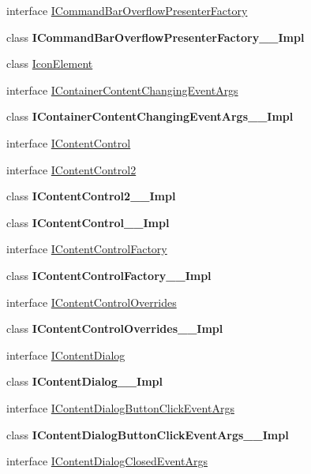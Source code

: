 \begin{DoxyCompactItemize}
\item 
interface \hyperlink{interface_windows_1_1_u_i_1_1_xaml_1_1_controls_1_1_i_command_bar_overflow_presenter_factory}{I\+Command\+Bar\+Overflow\+Presenter\+Factory}
\item 
class {\bfseries I\+Command\+Bar\+Overflow\+Presenter\+Factory\+\_\+\+\_\+\+Impl}
\item 
class \hyperlink{class_windows_1_1_u_i_1_1_xaml_1_1_controls_1_1_icon_element}{Icon\+Element}
\item 
interface \hyperlink{interface_windows_1_1_u_i_1_1_xaml_1_1_controls_1_1_i_container_content_changing_event_args}{I\+Container\+Content\+Changing\+Event\+Args}
\item 
class {\bfseries I\+Container\+Content\+Changing\+Event\+Args\+\_\+\+\_\+\+Impl}
\item 
interface \hyperlink{interface_windows_1_1_u_i_1_1_xaml_1_1_controls_1_1_i_content_control}{I\+Content\+Control}
\item 
interface \hyperlink{interface_windows_1_1_u_i_1_1_xaml_1_1_controls_1_1_i_content_control2}{I\+Content\+Control2}
\item 
class {\bfseries I\+Content\+Control2\+\_\+\+\_\+\+Impl}
\item 
class {\bfseries I\+Content\+Control\+\_\+\+\_\+\+Impl}
\item 
interface \hyperlink{interface_windows_1_1_u_i_1_1_xaml_1_1_controls_1_1_i_content_control_factory}{I\+Content\+Control\+Factory}
\item 
class {\bfseries I\+Content\+Control\+Factory\+\_\+\+\_\+\+Impl}
\item 
interface \hyperlink{interface_windows_1_1_u_i_1_1_xaml_1_1_controls_1_1_i_content_control_overrides}{I\+Content\+Control\+Overrides}
\item 
class {\bfseries I\+Content\+Control\+Overrides\+\_\+\+\_\+\+Impl}
\item 
interface \hyperlink{interface_windows_1_1_u_i_1_1_xaml_1_1_controls_1_1_i_content_dialog}{I\+Content\+Dialog}
\item 
class {\bfseries I\+Content\+Dialog\+\_\+\+\_\+\+Impl}
\item 
interface \hyperlink{interface_windows_1_1_u_i_1_1_xaml_1_1_controls_1_1_i_content_dialog_button_click_event_args}{I\+Content\+Dialog\+Button\+Click\+Event\+Args}
\item 
class {\bfseries I\+Content\+Dialog\+Button\+Click\+Event\+Args\+\_\+\+\_\+\+Impl}
\item 
interface \hyperlink{interface_windows_1_1_u_i_1_1_xaml_1_1_controls_1_1_i_content_dialog_closed_event_args}{I\+Content\+Dialog\+Closed\+Event\+Args}

\end{DoxyCompactItemize}
